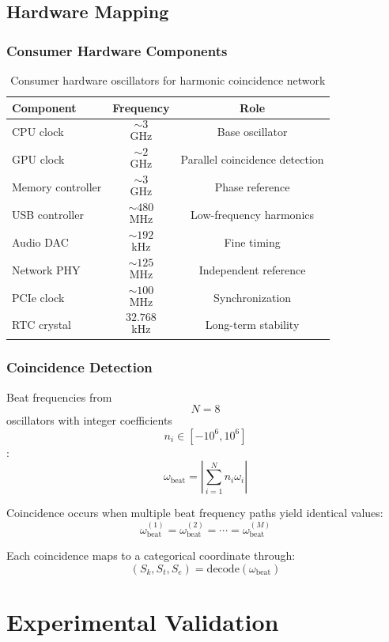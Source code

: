 \documentclass[11pt,twocolumn,a4paper]{article}
\theoremstyle{remark}
\begin{document}
\subsection{Hardware Mapping}

\subsubsection{Consumer Hardware Components}

\begin{table}[htbp]
\centering
\caption{Consumer hardware oscillators for harmonic coincidence network}
\label{tab:hardware_oscillators}
\begin{tabular}{lcc}
\toprule
\textbf{Component} & \textbf{Frequency} & \textbf{Role} \\
\midrule
CPU clock & $$\sim 3$$ GHz & Base oscillator \\
GPU clock & $$\sim 2$$ GHz & Parallel coincidence detection \\
Memory controller & $$\sim 3$$ GHz & Phase reference \\
USB controller & $$\sim 480$$ MHz & Low-frequency harmonics \\
Audio DAC & $$\sim 192$$ kHz & Fine timing \\
Network PHY & $$\sim 125$$ MHz & Independent reference \\
PCIe clock & $$\sim 100$$ MHz & Synchronization \\
RTC crystal & $$32.768$$ kHz & Long-term stability \\
\bottomrule
\end{tabular}
\end{table}

\subsubsection{Coincidence Detection}

Beat frequencies from $$N = 8$$ oscillators with integer coefficients $$n_i \in [-10^6, 10^6]$$:
$$
\omega_{\mathrm{beat}} = \left|\sum_{i=1}^N n_i \omega_i\right|
$$

Coincidence occurs when multiple beat frequency paths yield identical values:
$$
\omega_{\mathrm{beat}}^{(1)} = \omega_{\mathrm{beat}}^{(2)} = \cdots = \omega_{\mathrm{beat}}^{(M)}
$$

Each coincidence maps to a categorical coordinate through:
$$
(S_k, S_t, S_e) = \mathrm{decode}(\omega_{\mathrm{beat}})
$$

\section{Experimental Validation}
\label{sec:validation}
\end{document}
